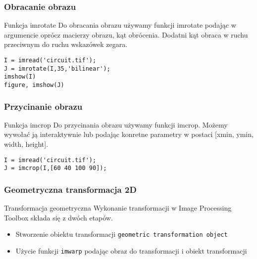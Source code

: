 \documentclass{beamer}
\begin{document}
\begin{frame}[fragile]
\frametitle{Obracanie obrazu}

\begin{block}{Funkcja imrotate}
Do obracania obrazu używamy funkcji imrotate podając w argumencie oprócz macierzy obrazu, kąt obrócenia. Dodatni kąt obraca w ruchu przeciwnym do ruchu wskazówek zegara.
\end{block}

\begin{example}
\begin{lstlisting}
I = imread('circuit.tif');
J = imrotate(I,35,'bilinear');
imshow(I)
figure, imshow(J)
\end{lstlisting}
\end{example}

\end{frame}


\begin{frame}[fragile]
\frametitle{Przycinanie obrazu}
\begin{block}{Funkcja imcrop}
Do przycinania obrazu używamy funkcji imcrop. Możemy wywołać ją interaktywnie lub podając konretne parametry w postaci [xmin, ymin, width, height].
\end{block}

\begin{example}
\begin{lstlisting}
I = imread('circuit.tif');
J = imcrop(I,[60 40 100 90]);
\end{lstlisting}
\end{example}

\end{frame}

\begin{frame}
\frametitle{Geometryczna transformacja 2D}

\begin{block}{Transformacja geometryczna}
Wykonanie transformacji w Image Processing Toolbox składa się z dwóch etapów.
\end{block}

\begin{itemize}
	\item Stworzenie obiektu transformacji \texttt{geometric transformation object}
	\item Użycie funkcji \texttt{imwarp} podając obraz do transformacji i obiekt transformacji
\end{itemize}
\end{frame}
\end{document}
